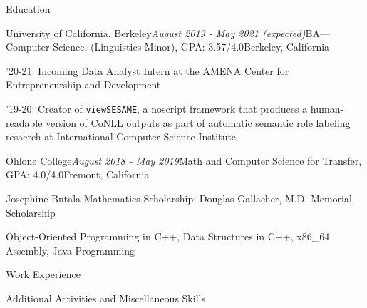 \documentclass{resume} %
\begin{document}

\begin{rSection}{Education}
\begin{rSubsection}{University of California, Berkeley}{\em August 2019 - May 2021 (expected)}{BA---Computer Science, (Linguistics Minor), GPA: 3.57/4.0}{Berkeley, California}
\item '20-21: Incoming Data Analyst Intern at the AMENA Center for Entrepreneurship and Development
\item '19-20: Creator of \texttt{viewSESAME}, a noscript framework that produces a human-readable version of CoNLL outputs as part of automatic semantic role labeling resaerch at International Computer Science Institute
\end{rSubsection}
\begin{rSubsection}{Ohlone College}{\em August 2018 - May 2019}{Math and Computer Science for Transfer, GPA: 4.0/4.0}{Fremont, California}
\item Josephine Butala Mathematics Scholarship; Douglas Gallacher, M.D. Memorial Scholarship
\item Object-Oriented Programming in C++, Data Structures in C++, x86\_64 Assembly, Java Programming
\end{rSubsection}
\end{rSection}
\begin{rSection}{Work Experience}



%
\end{rSection}
\begin{rSection}{Additional Activities and Miscellaneous Skills}

\end{rSection}
\end{document}

